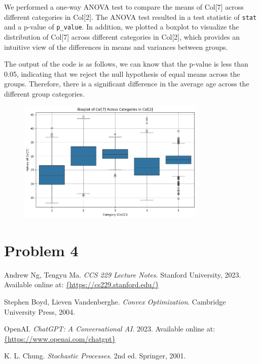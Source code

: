 \documentclass[12pt]{article}
\begin{document}
We performed a one-way ANOVA test to compare the means of Col[7] across different categories in Col[2]. The ANOVA test resulted in a test statistic of \texttt{stat} and a p-value of \texttt{p\_value}. In addition, we plotted a boxplot to visualize the distribution of Col[7] across different categories in Col[2], which provides an intuitive view of the differences in means and variances between groups. 


The output of the code is as follows, we can know that the p-value is less than 0.05, indicating that we reject the null hypothesis of equal means across the groups. Therefore, there is a significant difference in the average age across the different group categories.

\begin{figure}[h]
    \centering
    \includegraphics[width=0.8\textwidth]{image/output2.png}  
    \label{fig:Output for ANOVA test}
\end{figure}

\section*{Problem 4}

\newpage
\begin{thebibliography}{99}

    Andrew Ng, Tengyu Ma. \textit{CCS 229 Lecture Notes}. Stanford University, 2023. Available online at: \url{{https://cs229.stanford.edu/}}
    
    Stephen Boyd, Lieven Vandenberghe. \textit{Convex Optimization}. Cambridge University Press, 2004.
    
    OpenAI. \textit{ChatGPT: A Conversational AI}. 2023. Available online at: \url{{https://www.openai.com/chatgpt}}
    
    K. L. Chung. \textit{Stochastic Processes}. 2nd ed. Springer, 2001.

    \end{thebibliography}
    
\end{document}

